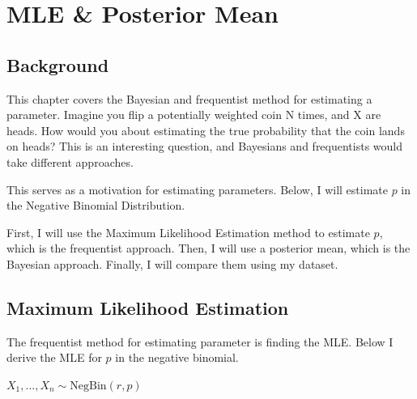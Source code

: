 \documentclass[
  letterpaper,
  DIV=11,
  numbers=noendperiod]{scrreprt}
\begin{document}
\chapter{MLE \& Posterior Mean}\label{mle-posterior-mean}

\section{Background}\label{background-1}

This chapter covers the Bayesian and frequentist method for estimating a
parameter. Imagine you flip a potentially weighted coin N times, and X
are heads. How would you about estimating the true probability that the
coin lands on heads? This is an interesting question, and Bayesians and
frequentists would take different approaches.

This serves as a motivation for estimating parameters. Below, I will
estimate \(p\) in the Negative Binomial Distribution.

First, I will use the Maximum Likelihood Estimation method to estimate
\(p\), which is the frequentist approach. Then, I will use a posterior
mean, which is the Bayesian approach. Finally, I will compare them using
my dataset.

\section{Maximum Likelihood
Estimation}\label{maximum-likelihood-estimation}

The frequentist method for estimating parameter is finding the MLE.
Below I derive the MLE for \(p\) in the negative binomial.

\(X_1,...,X_n \sim \text{NegBin}(r, p)\)
\end{document}
